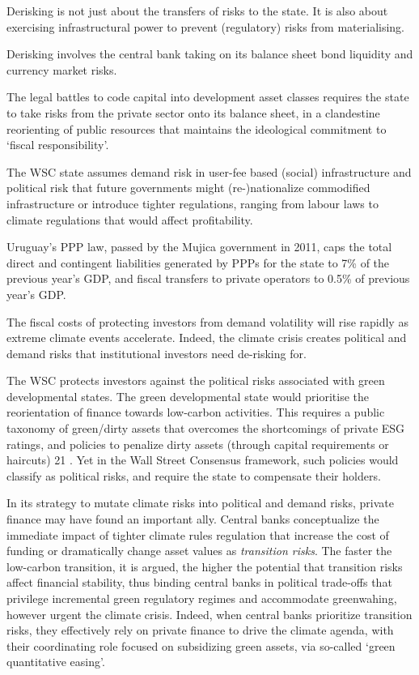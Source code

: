 \documentclass[
]{book}
\begin{document}
Derisking is not just about the transfers of risks to the state.
It is also about exercising infrastructural power to prevent
(regulatory) risks from materialising.

Derisking involves the central bank taking on its balance sheet bond liquidity and
currency market risks.

The legal battles to code capital into development asset
classes requires the state to take risks from the private sector onto its balance sheet, in
a clandestine reorienting of public resources that maintains the ideological commitment
to `fiscal responsibility'.

The WSC state assumes demand risk in user-fee based (social) infrastructure and
political risk that future governments might (re-)nationalize commodified
infrastructure or introduce tighter regulations, ranging from labour laws to climate
regulations that would affect profitability.

Uruguay's PPP law, passed by the
Mujica government in 2011, caps the total direct and contingent liabilities generated by
PPPs for the state to 7\% of the previous year's GDP, and fiscal transfers to private
operators to 0.5\% of previous year's GDP.

The fiscal costs of protecting investors from demand volatility will rise rapidly as
extreme climate events accelerate. Indeed, the climate crisis creates political and
demand risks that institutional investors need de-risking for.

The WSC protects investors against the political risks associated with green
developmental states. The green developmental state would prioritise the reorientation
of finance towards low-carbon activities. This requires a public taxonomy of green/dirty
assets that overcomes the shortcomings of private ESG ratings, and policies to penalize
dirty assets (through capital requirements or haircuts) 21 . Yet in the Wall Street
Consensus framework, such policies would classify as political risks, and require the
state to compensate their holders.

In its strategy to mutate climate risks into political and demand risks, private finance
may have found an important ally. Central banks conceptualize the immediate impact
of tighter climate rules regulation that increase the cost of funding or dramatically
change asset values as \emph{transition risks}.
The faster the low-carbon
transition, it is argued, the higher the potential that transition risks affect financial
stability, thus binding central banks in political trade-offs that privilege incremental
green regulatory regimes and accommodate greenwahing, however urgent the climate
crisis. Indeed, when central banks prioritize transition risks, they effectively rely on
private finance to drive the climate agenda, with their coordinating role focused on
subsidizing green assets, via so-called `green quantitative easing'.
\end{document}

